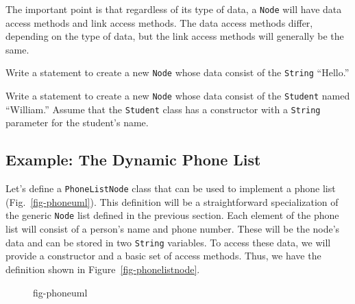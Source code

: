 The important point is that regardless of its type of data, a
{\tt Node} will have data access methods and link access methods.  The data
access methods differ, depending on the type of data, but the link
access methods will generally be the same.


\begin{SSTUDY}
\item  Write a statement to create a new {\tt Node} whose data
consist of the {\tt String} ``Hello.''

\item  Write a statement to create a new {\tt Node} whose data
consist of the {\tt Student} named ``William.''  Assume that the {\tt Student}
class has a constructor with a {\tt String} parameter for the student's name.
\end{SSTUDY}

\subsection{Example: The Dynamic Phone List}


\noindent Let's define a {\tt PhoneListNode} class that can be used to
implement a phone list (Fig.~\ref{fig-phoneuml}).  This definition
will be a straightforward specialization of the generic {\tt Node}
list defined in the previous section.  Each element of the phone list
will consist of a person's name and phone number.  These will be the
node's data and can be stored in two {\tt String} variables.  To
access these data, we will provide a
constructor and a basic set of access methods.  Thus, we have the
definition shown in Figure~\ref{fig-phonelistnode}.

\begin{figure}[t]
 {fig-phoneuml}
\end{figure}

